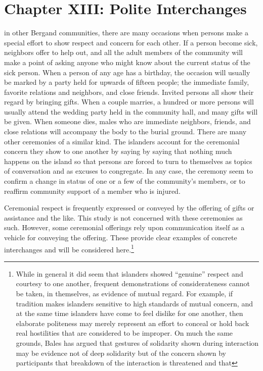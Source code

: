 \documentclass[twoside,symmetric,nobib,justified]{tufte-book}
\let\oldchapter\chapter
\def\chapter{%
  \setcounter{footnote}{0}%
  \oldchapter
}
\begin{document}
\chapter[CHAPTER XIII: POLITE INTERCHANGES]{Chapter XIII: Polite Interchanges}
\label{ch:Chapter XIII: Polite Interchanges}

 in other Bergand communities, there are many
occasions when persons make a special effort to show respect and concern
for each other. If a person become sick, neighbors offer to help out,
and all the adult members of the community will make a point of asking
anyone who might know about the current status of the sick person. When
a person of any age has a birthday, the occasion will usually be marked
by a party held for upwards of fifteen people; the immediate family,
favorite relations and neighbors, and close friends. Invited persons all
show their regard by bringing gifts. When a couple marries, a hundred or
more persons will usually attend the wedding party held in the community
hall, and many gifts will be given. When someone dies, males who are
immediate neighbors, friends, and close relations will accompany the
body to the burial ground. There are many other ceremonies of a similar
kind. The islanders account for the ceremonial concern they show to one
another by saying by saying that nothing much happens on the island so
that persons are forced to turn to themselves as topics of conversation
and as excuses to congregate. In any case, the ceremony seem to confirm
a change in status of one or a few of the community's members, or to
reaffirm community support of a member who is injured.

Ceremonial respect is frequently expressed or conveyed by the offering
of gifts or assistance and the like. This study is not concerned with
these ceremonies as such. However, some ceremonial offerings rely upon
communication itself as a vehicle for conveying the offering. These
provide clear examples of concrete interchanges and will be considered
here.\footnote{While in general it did seem that islanders showed
  ``genuine'' respect and courtesy to one another, frequent
  demonstrations of considerateness cannot be taken, in themselves, as
  evidence of mutual regard. For example, if tradition makes islanders
  sensitive to high standards of mutual concern, and at the same time
  islanders have come to feel dislike for one another, then elaborate politeness may merely represent an effort to conceal or hold back real
  hostilities that are considered to be improper. On much the same
  grounds, Bales has argued that gestures of solidarity shown during
  interaction may be evidence not of deep solidarity but of the concern
  shown by participants that breakdown of the interaction is threatened
  and that}
\end{document}
